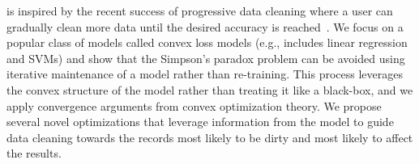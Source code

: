 \sys is inspired by the recent success of progressive data cleaning where a user can gradually clean more data until the desired accuracy is reached~\cite{altowim2014progressive, whang2014incremental, papenbrock2015progressive, gruenheid2014incremental, mayfield2010eracer, DBLP:journals/pvldb/YakoutENOI11, yakout2013don}.
We focus on a popular class of models called convex loss models (e.g., includes linear regression and SVMs) and show that the Simpson's paradox problem can be avoided using iterative maintenance of a model rather than re-training.
This process leverages the convex structure of the model rather than treating it like a black-box, and we apply convergence arguments from convex optimization theory.
We propose several novel optimizations that leverage information from the model to guide data cleaning towards the records most likely to be dirty and most likely to affect the results.











